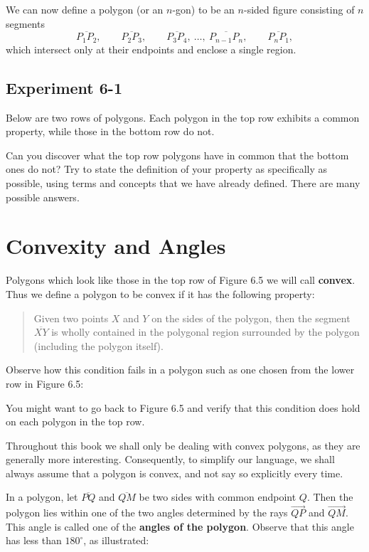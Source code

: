 \documentclass[12pt]{book} %
\begin{document}
We can now define a polygon (or an $n$-gon) to be an $n$-sided figure consisting of $n$ segments
\[
\overline{P_1P_2},\qquad \overline{P_2P_3},\qquad \overline{P_3P_4},\ \dots,\ \overline{P_{n-1}P_n},\qquad \overline{P_nP_1},
\]
which intersect only at their endpoints and enclose a single region.

\subsection*{Experiment 6-1}

Below are two rows of polygons. Each polygon in the top row exhibits a common property, while those in the bottom row do not.


Can you discover what the top row polygons have in common that the bottom ones do not? Try to state the definition of your property as specifically as possible, using terms and concepts that we have already defined. There are many possible answers.

\section{Convexity and Angles}

Polygons which look like those in the top row of Figure 6.5 we will call \textbf{convex}. Thus we define a polygon to be convex if it has the following property:

\begin{quote}
Given two points $X$ and $Y$ on the sides of the polygon, then the segment $\overline{XY}$ is wholly contained in the polygonal region surrounded by the polygon (including the polygon itself).
\end{quote}

Observe how this condition fails in a polygon such as one chosen from the lower row in Figure 6.5:


You might want to go back to Figure 6.5 and verify that this condition does hold on each polygon in the top row.

Throughout this book we shall only be dealing with convex polygons, as they are generally more interesting. Consequently, to simplify our language, we shall always assume that a polygon is convex, and not say so explicitly every time.

In a polygon, let $\overline{PQ}$ and $\overline{QM}$ be two sides with common endpoint $Q$. Then the polygon lies within one of the two angles determined by the rays $\overrightarrow{QP}$ and $\overrightarrow{QM}$. This angle is called one of the \textbf{angles of the polygon}. Observe that this angle has less than $180^\circ$, as illustrated:
\end{document}
